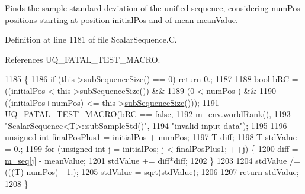 Finds the sample standard deviation of the unified sequence, considering {\ttfamily num\-Pos} positions starting at position {\ttfamily initial\-Pos} and of mean {\ttfamily mean\-Value}. 



Definition at line 1181 of file Scalar\-Sequence.\-C.



References U\-Q\-\_\-\-F\-A\-T\-A\-L\-\_\-\-T\-E\-S\-T\-\_\-\-M\-A\-C\-R\-O.


\begin{DoxyCode}
1185 \{
1186   \textcolor{keywordflow}{if} (this->\hyperlink{class_q_u_e_s_o_1_1_scalar_sequence_a0288ea295eedc216a1617b3286f6f3a0}{subSequenceSize}() == 0) \textcolor{keywordflow}{return} 0.;
1187 
1188   \textcolor{keywordtype}{bool} bRC = ((initialPos          <  this->\hyperlink{class_q_u_e_s_o_1_1_scalar_sequence_a0288ea295eedc216a1617b3286f6f3a0}{subSequenceSize}()) &&
1189               (0                   <  numPos                 ) &&
1190               ((initialPos+numPos) <= this->\hyperlink{class_q_u_e_s_o_1_1_scalar_sequence_a0288ea295eedc216a1617b3286f6f3a0}{subSequenceSize}()));
1191   \hyperlink{_defines_8h_a56d63d18d0a6d45757de47fcc06f574d}{UQ\_FATAL\_TEST\_MACRO}(bRC == \textcolor{keyword}{false},
1192                       \hyperlink{class_q_u_e_s_o_1_1_scalar_sequence_a71618cd6351b29361b437af68447a4c8}{m\_env}.\hyperlink{class_q_u_e_s_o_1_1_base_environment_a78b57112bbd0e6dd0e8afec00b40ffa7}{worldRank}(),
1193                       \textcolor{stringliteral}{"ScalarSequence<T>::subSampleStd()"},
1194                       \textcolor{stringliteral}{"invalid input data"});
1195 
1196   \textcolor{keywordtype}{unsigned} \textcolor{keywordtype}{int} finalPosPlus1 = initialPos + numPos;
1197   T diff;
1198   T stdValue = 0.;
1199   \textcolor{keywordflow}{for} (\textcolor{keywordtype}{unsigned} \textcolor{keywordtype}{int} j = initialPos; j < finalPosPlus1; ++j) \{
1200     diff = \hyperlink{class_q_u_e_s_o_1_1_scalar_sequence_ae616036fd2e62fb69df167814545e893}{m\_seq}[j] - meanValue;
1201     stdValue += diff*diff;
1202   \}
1203 
1204   stdValue /= (((T) numPos) - 1.);
1205   stdValue = sqrt(stdValue);
1206 
1207   \textcolor{keywordflow}{return} stdValue;
1208 \}
\end{DoxyCode}
